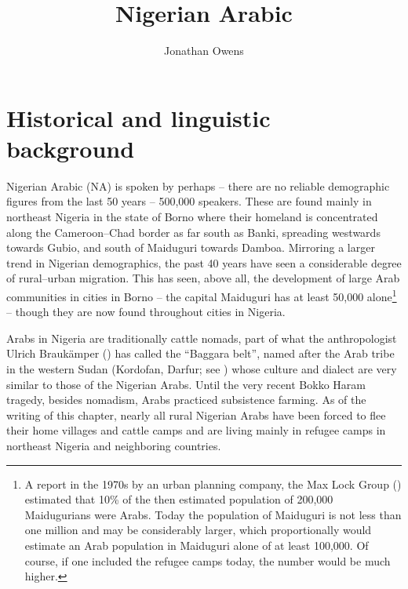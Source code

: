 \documentclass[output=paper]{langsci/langscibook}
\author{Jonathan Owens\affiliation{University of Bayreuth}}
\title{Nigerian Arabic}
\begin{document}
 

\section{
Historical and linguistic background
}

Nigerian Arabic (NA) is spoken by perhaps – there are no reliable demographic figures from the last 50 years – 500,000 speakers. These are found mainly in northeast Nigeria in the state of Borno where their homeland is concentrated along the Cameroon--Chad border as far south as Banki, spreading westwards towards Gubio, and south of Maiduguri towards Damboa. Mirroring a larger trend in Nigerian demographics, the past 40 years have seen a considerable degree of rural–urban migration. This has seen, above all, the development of large Arab communities in cities in Borno – the capital Maiduguri has at least 50,000 alone\footnote{A report in the 1970s by an urban planning company, the Max Lock Group (\citeyear{MaxLockGroup1976}) estimated that 10\% of the then estimated population of 200,000 Maidugurians were Arabs. Today the population of Maiduguri is not less than one million and may be considerably larger, which proportionally would estimate an Arab population in Maiduguri alone of at least 100,000. Of course, if one included the refugee camps today, the number would be much higher.} – though they are now found throughout cities in Nigeria. 

Arabs in Nigeria are traditionally cattle nomads, part of what the anthropologist Ulrich Braukämper (\citeyear{Braukämper1994}) has called the “Baggara belt”, named after the Arab tribe in the western Sudan (Kordofan, Darfur; see \citealt{Manfredi2010}) whose culture and dialect are very similar to those of the Nigerian Arabs. Until the very recent Bokko Haram tragedy, besides nomadism, Arabs practiced subsistence farming. As of the writing of this chapter, nearly all rural Nigerian Arabs have been forced to flee their home villages and cattle camps and are living mainly in refugee camps in northeast Nigeria and neighboring countries. 
\end{document}
